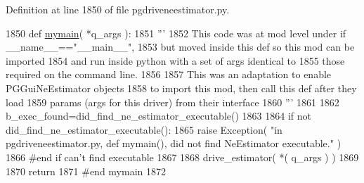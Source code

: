 Definition at line 1850 of file pgdriveneestimator.\+py.


\begin{DoxyCode}
1850 \textcolor{keyword}{def }\hyperlink{namespacenegui_1_1pgdriveneestimator_a9195d73a2642b87625772820ffff8023}{mymain}( *q\_args ):
1851     \textcolor{stringliteral}{'''}
1852 \textcolor{stringliteral}{    This code was at mod level under if \_\_name\_\_=="\_\_main\_\_",}
1853 \textcolor{stringliteral}{    but moved inside this def so this mod can be imported}
1854 \textcolor{stringliteral}{    and run inside python with a set of args identical to}
1855 \textcolor{stringliteral}{    those required on the command line.}
1856 \textcolor{stringliteral}{}
1857 \textcolor{stringliteral}{    This was an adaptation to enable PGGuiNeEstimator objects}
1858 \textcolor{stringliteral}{    to import this mod, then call this def after they load }
1859 \textcolor{stringliteral}{    params (args for this driver) from their interface}
1860 \textcolor{stringliteral}{    '''}
1861 
1862     b\_exec\_found=did\_find\_ne\_estimator\_executable()
1863 
1864     \textcolor{keywordflow}{if} \textcolor{keywordflow}{not} did\_find\_ne\_estimator\_executable():
1865         \textcolor{keywordflow}{raise} Exception( \textcolor{stringliteral}{"in pgdriveneestimator.py, def mymain(), did not find NeEstimator executable."} )
1866     \textcolor{comment}{#end if can't find executable}
1867 
1868     drive\_estimator(  *( q\_args ) )
1869 
1870     \textcolor{keywordflow}{return}
1871 \textcolor{comment}{#end mymain}
1872 
\end{DoxyCode}
